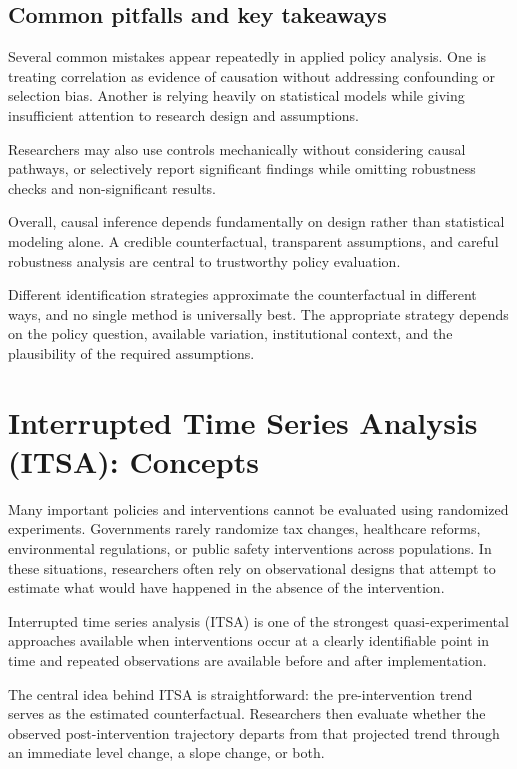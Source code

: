 \documentclass[
  11pt,
  oneside]{book}
\begin{document}
\section{Common pitfalls and key takeaways}\label{common-pitfalls-and-key-takeaways-4}

Several common mistakes appear repeatedly in applied policy analysis. One is treating correlation as evidence of causation without addressing confounding or selection bias. Another is relying heavily on statistical models while giving insufficient attention to research design and assumptions.

Researchers may also use controls mechanically without considering causal pathways, or selectively report significant findings while omitting robustness checks and non-significant results.

Overall, causal inference depends fundamentally on design rather than statistical modeling alone. A credible counterfactual, transparent assumptions, and careful robustness analysis are central to trustworthy policy evaluation.

Different identification strategies approximate the counterfactual in different ways, and no single method is universally best. The appropriate strategy depends on the policy question, available variation, institutional context, and the plausibility of the required assumptions.

\chapter{Interrupted Time Series Analysis (ITSA): Concepts}\label{itsa}

Many important policies and interventions cannot be evaluated using randomized experiments. Governments rarely randomize tax changes, healthcare reforms, environmental regulations, or public safety interventions across populations. In these situations, researchers often rely on observational designs that attempt to estimate what would have happened in the absence of the intervention.

Interrupted time series analysis (ITSA) is one of the strongest quasi-experimental approaches available when interventions occur at a clearly identifiable point in time and repeated observations are available before and after implementation.

The central idea behind ITSA is straightforward: the pre-intervention trend serves as the estimated counterfactual. Researchers then evaluate whether the observed post-intervention trajectory departs from that projected trend through an immediate level change, a slope change, or both.
\end{document}
